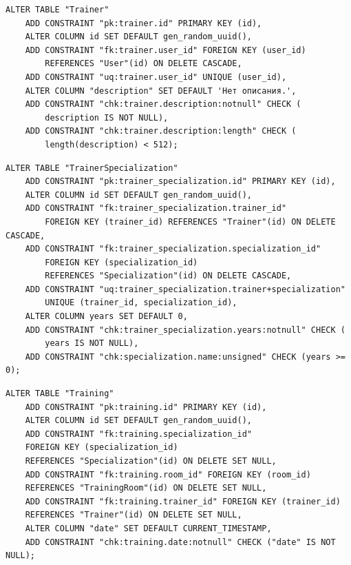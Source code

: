 \begin{lstlisting}[label=alg:16, caption=Реализация  ограничений целостности данных отношения Trainer, captionpos=t]
ALTER TABLE "Trainer"
	ADD CONSTRAINT "pk:trainer.id" PRIMARY KEY (id),
	ALTER COLUMN id SET DEFAULT gen_random_uuid(),
	ADD CONSTRAINT "fk:trainer.user_id" FOREIGN KEY (user_id) 
		REFERENCES "User"(id) ON DELETE CASCADE,
	ADD CONSTRAINT "uq:trainer.user_id" UNIQUE (user_id),
	ALTER COLUMN "description" SET DEFAULT 'Нет описания.',
	ADD CONSTRAINT "chk:trainer.description:notnull" CHECK (
		description IS NOT NULL),
	ADD CONSTRAINT "chk:trainer.description:length" CHECK (
		length(description) < 512);
\end{lstlisting}

\begin{lstlisting}[label=alg:18, caption=Реализация  ограничений целостности данных отношения TrainerSpecialization, captionpos=t]
ALTER TABLE "TrainerSpecialization"
	ADD CONSTRAINT "pk:trainer_specialization.id" PRIMARY KEY (id),
	ALTER COLUMN id SET DEFAULT gen_random_uuid(),
	ADD CONSTRAINT "fk:trainer_specialization.trainer_id" 
		FOREIGN KEY (trainer_id) REFERENCES "Trainer"(id) ON DELETE CASCADE,
	ADD CONSTRAINT "fk:trainer_specialization.specialization_id" 
		FOREIGN KEY (specialization_id) 
		REFERENCES "Specialization"(id) ON DELETE CASCADE,
	ADD CONSTRAINT "uq:trainer_specialization.trainer+specialization" 
		UNIQUE (trainer_id, specialization_id),
	ALTER COLUMN years SET DEFAULT 0,
	ADD CONSTRAINT "chk:trainer_specialization.years:notnull" CHECK (
		years IS NOT NULL),
	ADD CONSTRAINT "chk:specialization.name:unsigned" CHECK (years >= 0);
\end{lstlisting}

\begin{lstlisting}[label=alg:25, caption=Реализация  ограничений целостности данных отношения Training, captionpos=t]
ALTER TABLE "Training"
	ADD CONSTRAINT "pk:training.id" PRIMARY KEY (id),
	ALTER COLUMN id SET DEFAULT gen_random_uuid(),
	ADD CONSTRAINT "fk:training.specialization_id" 
	FOREIGN KEY (specialization_id) 
	REFERENCES "Specialization"(id) ON DELETE SET NULL,
	ADD CONSTRAINT "fk:training.room_id" FOREIGN KEY (room_id) 
	REFERENCES "TrainingRoom"(id) ON DELETE SET NULL,
	ADD CONSTRAINT "fk:training.trainer_id" FOREIGN KEY (trainer_id) 
	REFERENCES "Trainer"(id) ON DELETE SET NULL,
	ALTER COLUMN "date" SET DEFAULT CURRENT_TIMESTAMP,
	ADD CONSTRAINT "chk:training.date:notnull" CHECK ("date" IS NOT NULL);
\end{lstlisting}

